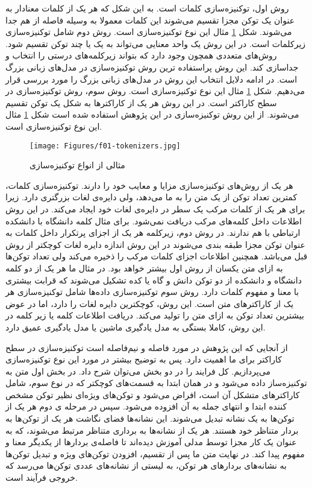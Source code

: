  روش اول، توکنیزه‌سازی کلمات است. به این شکل که هر یک از کلمات معنادار به عنوان یک توکن مجزا تقسیم می‌شوند‌ این کلمات معمولا به وسیله فاصله از هم جدا می‌شوند. شکل \ref{fig:tokenizers} مثال این نوع توکنیزه‌سازی است. روش دوم شامل توکنیزه‌سازی زیر‌کلمات است. در این روش یک واحد معنایی می‌تواند به یک یا چند توکن تقسیم شود. روش‌های متعددی همچون \cite{sennrich2016byte} وجود دارد که بتواند زیر‌کلمه‌های درستی را انتخاب و جداسازی کند. این روش پراستفاده ترین روش توکنیزه‌سازی در مدل‌های زبانی بزرگ است. در ادامه دلایل انتخاب این روش در مدل‌های زبانی بزرگ را مورد بررسی قرار می‌دهیم. شکل \ref{fig:tokenizers} مثال این نوع توکنیزه‌سازی است. روش سوم، روش توکنیزه‌سازی در سطح کاراکتر است. در این روش هر یک از کاراکترها به شکل یک توکن تقسیم می‌شوند. از این روش توکنیزه‌سازی در این پژوهش استفاده شده است شکل \ref{fig:tokenizers} مثال این نوع توکنیزه‌سازی است.
 \begin{figure}[H]
      \centering
      \texttt{[image: Figures/f01-tokenizers.jpg]}
      \caption{مثالی از انواع توکنیزه‌سازی}
      \label{fig:tokenizers}
  \end{figure}

هر یک از روش‌های توکنیزه‌سازی مزایا و معایب خود را دارند. توکنیزه‌سازی کلمات، کمترین تعداد توکن از یک متن را به ما می‌دهد، ولی دایره‌ی لغات بزرگتری دارد. زیرا برای هر یک از کلمات مرکب یک سطر در دایره‌ی لغات خود ایجاد می‌کند. در این روش اطلاعات داخل کلمه‌های مرکب دریافت نمی‌شود. برای مثال کلمه دانشگاه با دانشکده ارتباطی با هم ندارند. در روش دوم، زیر‌کلمه هر یک از اجزای پرتکرار داخل کلمات به عنوان توکن مجزا طبقه بندی می‌شوند در این روش اندازه دایره لغات کوچکتر از روش قبل می‌باشد. همچنین اطلاعات اجزای کلمات مرکب را ذخیره می‌کند ولی تعداد توکن‌ها به ازای متن یکسان از روش اول بیشتر خواهد بود. در مثال ما هر یک از دو کلمه دانشگاه و دانشکده از دو توکن دانش و گاه یا کده تشکیل می‌شوند که قرابت بیشتری با معنا و مفهوم کلمات دارد. روش سوم توکنیزه‌سازی داده‌ها شامل توکنیزه‌سازی هر یک از کاراکتر‌های متن است. این روش، کوچکترین دایره لغات را دارد، اما در عوض بیشترین تعداد توکن به ازای متن را تولید می‌کند. دریافت اطلاعات کلمه یا زیر کلمه در این روش، کاملا بستگی به مدل یادگیری ماشین یا مدل یادگیری عمیق دارد.

از آنجایی که این پژوهش در مورد فاصله و نیم‌فاصله است توکنیزه‌سازی در سطح کاراکتر برای ما اهمیت دارد. پس به توضیح بیشتر در مورد این نوع توکنیزه‌سازی می‌پردازیم. کل فرایند را در دو بخش می‌توان شرح داد.
 در بخش اول متن به توکنیزه‌ساز داده می‌شود و در همان ابتدا به قسمت‌های کوچکتر که در نوع سوم، شامل کاراکتر‌های متشکل آن است، افراض می‌شود و توکن‌های ویژه‌ای نظیر توکن مشخص کننده ابتدا و انتهای جمله به آن افزوده می‌شود. سپس در مرحله ی دوم هر یک از توکن‌ها به یک نشانه تبدیل می‌شوند. این نشانه‌ها فضای نگاشت هر یک از توکن‌ها به بردار متناظر خود هستند. هر یک از نشانه‌ها به برداری متناظر مرتبط مى‌شوند، که به عنوان یک کار مجزا توسط مدلی آموزش دیده‌اند تا فاصله‌ی بردار‌ها از یکدیگر معنا و مفهوم پیدا کند.
در نهایت متن ما پس از تقسیم، افزودن توکن‌های ویژه و تبدیل توکن‌ها به نشانه‌های بردارهای هر توکن، به لیستی از نشانه‌های عددی توکن‌ها می‌رسد که خروجی فرآیند است.




